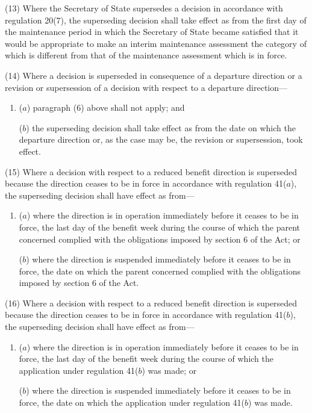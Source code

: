 \documentclass[a4paper,12pt]{article}
\begin{document}
(13) Where the Secretary of State supersedes a decision in accordance with regulation 20(7), the superseding decision shall take effect as from the first day of the maintenance period in which the Secretary of State became satisfied that it would be appropriate to make an interim maintenance assessment the category of which is different from that of the maintenance assessment which is in force.

(14) Where a decision is superseded in consequence of a departure direction or a revision or supersession of a decision with respect to a departure direction---
\begin{enumerate}\item[]
($a$) paragraph (6) above shall not apply; and

($b$) the superseding decision shall take effect as from the date on which the departure direction or, as the case may be, the revision or supersession, took effect.
\end{enumerate}

(15) Where a decision with respect to a reduced benefit direction is superseded because the direction ceases to be in force in accordance with regulation 41($a$), the superseding decision shall have effect as from---
\begin{enumerate}\item[]
($a$) where the direction is in operation immediately before it ceases to be in force, the last day of the benefit week during the course of which the parent concerned complied with the obligations imposed by section 6 of the Act; or

($b$) where the direction is suspended immediately before it ceases to be in force, the date on which the parent concerned complied with the obligations imposed by section 6 of the Act.
\end{enumerate}

(16) Where a decision with respect to a reduced benefit direction is superseded because the direction ceases to be in force in accordance with regulation 41($b$), the superseding decision shall have effect as from---
\begin{enumerate}\item[]
($a$) where the direction is in operation immediately before it ceases to be in force, the last day of the benefit week during the course of which the application under regulation 41($b$) was made; or

($b$) where the direction is suspended immediately before it ceases to be in force, the date on which the application under regulation 41($b$) was made.
\end{enumerate}
\end{document}
